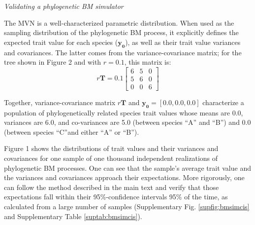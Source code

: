 \documentclass[oneside]{article}
\begin{document}
\begin{tcolorbox}[breakable, width=\textwidth, colback=gray!10, boxrule=0pt,
  title=Box 1: Models characterized by well-known parametric distributions, fonttitle=\bfseries]
\emph{Validating a phylogenetic BM simulator}

The MVN is a well-characterized parametric distribution.
When used as the sampling distribution of the phylogenetic BM process, it explicitly defines the expected trait value for each species ($\boldsymbol{y_0}$), as well as their trait value variances and covariances.
The latter comes from the variance-covariance matrix; for the tree shown in Figure 2 and with $r = 0.1$, this matrix
is:
\begin{equation}
  r\boldsymbol{T} = 0.1
  \begin{bmatrix}
    6 & 5 & 0\\
    5 & 6 & 0\\
    0 & 0 & 6
  \end{bmatrix}
  \label{eq:mat}
\end{equation}

Together, variance-covariance matrix $r\boldsymbol{T}$ and $\boldsymbol{y_0} = [0.0, 0.0, 0.0]$ characterize a population of phylogenetically related species trait values whose means are 0.0, variances are 6.0, and co-variances are 5.0 (between species ``A'' and ``B'') and 0.0 (between species ``C''and either ``A'' or ``B'').

\vspace{.25cm}

Figure 1 shows the distributions of trait values and their variances and covariances for one sample of one thousand independent realizations of phylogenetic BM processes. 
One can see that the sample's average trait value and the variances and covariances approach their expectations. 
More rigorously, one can follow the method described in the main text and verify that those expectations fall within their 95\%-confidence intervals 95\% of the time, as calculated from a large number of samples (Supplementary Fig. \ref{supfig:bmsimcis} and Supplementary Table \ref{suptab:bmsimcis}).

\end{tcolorbox}
\end{document}
